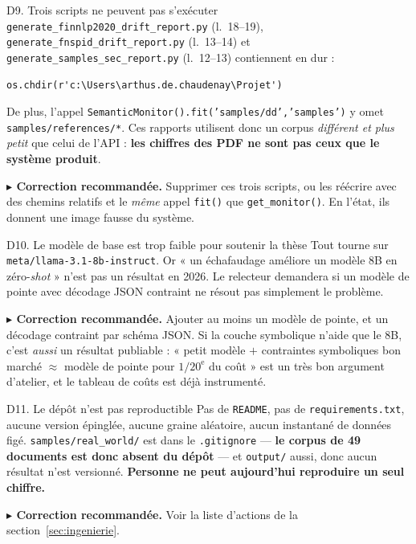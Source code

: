 \documentclass[11pt,a4paper]{article}
\newcommand{\corr}[1]{%
  \par\vspace{4pt}%
  \noindent\textbf{\textcolor{cExp}{$\blacktriangleright$ Correction recommandée.}} #1%
}
\newcommand{\fic}[1]{\texttt{\small #1}}
\begin{document}
\begin{serieux}{D9. Trois scripts ne peuvent pas s'exécuter}
\fic{generate\_finnlp2020\_drift\_report.py} (l.~18--19),
\fic{generate\_fnspid\_drift\_report.py} (l.~13--14) et
\fic{generate\_samples\_sec\_report.py} (l.~12--13) contiennent en dur :
\begin{lstlisting}
os.chdir(r'c:\Users\arthus.de.chaudenay\Projet')
\end{lstlisting}
De plus, l'appel \fic{SemanticMonitor().fit('samples/dd','samples')} y omet
\fic{samples/references/*}. Ces rapports utilisent donc un corpus
\emph{différent et plus petit} que celui de l'API : \textbf{les chiffres des PDF
ne sont pas ceux que le système produit}.

\corr{Supprimer ces trois scripts, ou les réécrire avec des chemins relatifs et
le \emph{même} appel \fic{fit()} que \fic{get\_monitor()}. En l'état, ils
donnent une image fausse du système.}
\end{serieux}

\begin{serieux}{D10. Le modèle de base est trop faible pour soutenir la thèse}
Tout tourne sur \fic{meta/llama-3.1-8b-instruct}. Or « un échafaudage améliore
un modèle 8B en zéro-\textit{shot} » n'est pas un résultat en 2026. Le
relecteur demandera si un modèle de pointe avec décodage JSON contraint ne
résout pas simplement le problème.

\corr{Ajouter au moins un modèle de pointe, et un décodage contraint par
schéma JSON. Si la couche symbolique n'aide que le 8B, c'est \emph{aussi} un
résultat publiable : « petit modèle $+$ contraintes symboliques bon marché
$\approx$ modèle de pointe pour $1/20^{\text{e}}$ du coût » est un très bon
argument d'atelier, et le tableau de coûts est déjà instrumenté.}
\end{serieux}

\begin{serieux}{D11. Le dépôt n'est pas reproductible}
Pas de \fic{README}, pas de \fic{requirements.txt}, aucune version épinglée,
aucune graine aléatoire, aucun instantané de données figé.
\fic{samples/real\_world/} est dans le \fic{.gitignore} --- \textbf{le corpus de
49 documents est donc absent du dépôt} --- et \fic{output/} aussi, donc aucun
résultat n'est versionné. \textbf{Personne ne peut aujourd'hui reproduire un
seul chiffre.}

\corr{Voir la liste d'actions de la section~\ref{sec:ingenierie}.}
\end{serieux}
\end{document}
